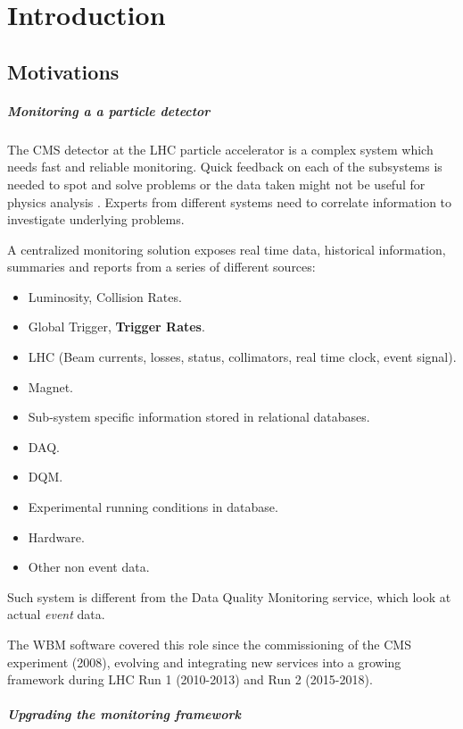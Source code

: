 \chapter{Introduction}

\section{Motivations}

\paragraph{Monitoring a a particle detector} The CMS detector at the LHC particle accelerator is a complex system which needs fast and reliable monitoring. Quick feedback on each of the subsystems is needed to spot and solve problems or the data taken might not be useful for physics analysis \cite{chep2016wbm}. Experts from different systems need to correlate information to investigate underlying problems.

A centralized monitoring solution exposes real time data, historical information, summaries and reports from a series of different sources:

\begin{itemize}
	\item Luminosity, Collision Rates.
	\item Global Trigger, \textbf{Trigger Rates}.
	\item LHC (Beam currents, losses, status, collimators, real time clock, event signal).
	\item Magnet.
	\item Sub-system specific information stored in relational databases.
	\item DAQ.
	\item DQM.
	\item Experimental running conditions in database.
	\item Hardware.
	\item Other non event data.
\end{itemize}

Such system is different from the Data Quality Monitoring service, which look at actual \textit{event} data.

The WBM software covered this role since the commissioning of the CMS experiment (2008), evolving and integrating new services into a growing framework during LHC Run 1 (2010-2013) and Run 2 (2015-2018).

\paragraph{Upgrading the monitoring framework} 

